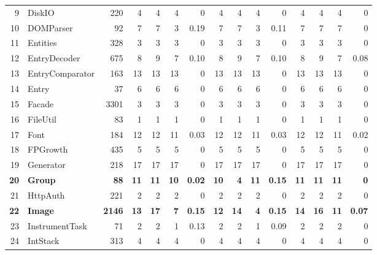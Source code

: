\documentclass[conference]{IEEEtran}
\begin{document}
\begin{table} [htp!]
{\begin{tabularx}{0.91 \textwidth}{|r|l|r|r|r|r|r|r|r|r|r|r|r|r|r|}
9						& DiskIO					&220		& 4		&	4	&	4	& 	0					& 4		& 4 		& 4		& 		0			& 4			& 4			& 4			&	0\\      
10						& DOMParser				&92			& 7		&	7	&	3	& 	0.19					& 7		& 7 		& 3		& 		0.11			& 7			& 7			& 7			&	0\\      
11						& Entities					&328		& 3		&	3	&	3	& 	0					& 3		& 3 		& 3		& 		0			& 3			& 3			& 3			&	0\\      
12						& EntryDecoder			&675		& 8		&	9	&	7	& 	0.10					& 8		& 9 		& 7		& 		0.10			& 8			& 9			& 7			&	0.08\\   
13						& EntryComparator			&163		& 13		&	13	&	13	& 	0					& 13		& 13 		& 13		& 		0			& 13			& 13			& 13			&	0\\      
14						& Entry					&37			& 6		&	6	&	6	& 	0					& 6		& 6 		& 6		& 		0			& 6			& 6			& 6			&	0\\   
15						& Facade					&3301		& 3		&	3	&	3	& 	0					& 3		& 3 		& 3		& 		0			& 3			& 3			& 3			&	0\\   
16						& FileUtil					&83			& 1		&	1	&	1	& 	0					& 1		& 1 		& 1		& 		0			& 1			& 1			& 1			&	0\\      
17						& Font					&184		&12		&	12	&	11	& 	0.03					& 12		& 12 		& 11		& 		0.03			& 12			& 12			& 11			&	0.02\\        
18						& FPGrowth				&435		& 5		&	5	&	5	& 	0					& 5		&  5		& 5		& 		0			& 5			& 5			& 5			&	0	\\       
19						& Generator				&218		& 17		&	17	&	17	& 	0					& 17		& 17 		& 17		& 		0			& 17			& 17			& 17			&	0	\\      
\textbf{20}						& \textbf{Group}					&\textbf{88}			& \textbf{11}		&	\textbf{11}	&	\textbf{10}	& 	\textbf{0.02}					& \textbf{10}		& \textbf{4} 		& \textbf{11}		& 		\textbf{0.15}			& \textbf{11}			& \textbf{11}			& \textbf{11}			&	\textbf{0}	\\      
21						& HttpAuth				&221		& 2		&	2	&	2	& 	0					& 2		& 2 		& 2		& 		0			& 2			& 2			& 2			&	0	\\         
\textbf{22}						& \textbf{Image}					&\textbf{2146}		& \textbf{13}		&	\textbf{17}	&	\textbf{7}	& 	\textbf{0.15}					& \textbf{12}		& \textbf{14} 		& \textbf{4}	& 		\textbf{0.15}			& \textbf{14}			& \textbf{16}			& \textbf{11}			&	\textbf{0.07}\\        
23						& InstrumentTask			&71			& 2		&	2	&	1	& 	0.13					& 2		& 2 		& 1		& 		0.09			& 2			& 2			& 2			&	0	\\    
24						& IntStack					&313		& 4		&	4	&	4	& 	0					& 4		& 4 		& 4		& 		0			& 4			& 4			& 4			&	0	\\      

\end{tabularx}}
\end{table}
\end{document}
